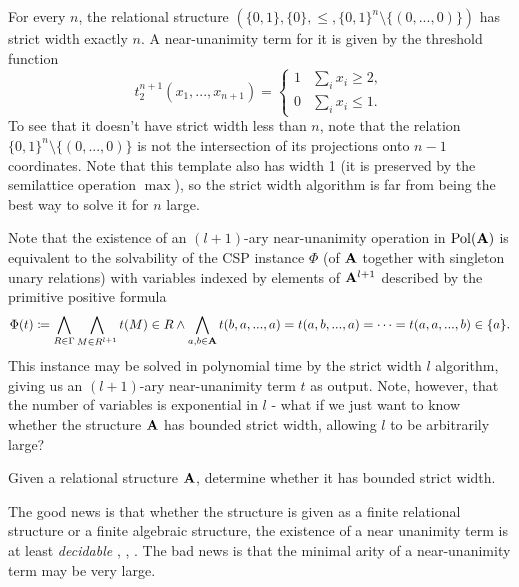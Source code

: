 \documentclass[letterpaper,11pt]{article}
\DeclareMathOperator{\Pol}{Pol}
\begin{document}

\begin{ex}\label{ex-strict-width-n} For every $n$, the relational structure $(\{0,1\}, \{0\}, \le, \{0,1\}^n\setminus\{(0,...,0)\})$ has strict width exactly $n$. A near-unanimity term for it is given by the threshold function
\[
t_2^{n+1}(x_1, ..., x_{n+1}) = \begin{cases} 1 & \sum_i x_i \ge 2,\\ 0 & \sum_i x_i \le 1.\end{cases}
\]
To see that it doesn't have strict width less than $n$, note that the relation $\{0,1\}^n\setminus\{(0,...,0)\}$ is not the intersection of its projections onto $n-1$ coordinates. Note that this template also has width 1 (it is preserved by the semilattice operation $\max$), so the strict width algorithm is far from being the best way to solve it for $n$ large.
\end{ex}

Note that the existence of an $(l+1)$-ary near-unanimity operation in $\Pol(\fA)$ is equivalent to the solvability of the CSP instance $\Phi$ (of $\mathbf{A}$ together with singleton unary relations) with variables indexed by elements of $\mathbf{A}^{l+1}$ described by the primitive positive formula
\[
\Phi(t) \coloneqq \bigwedge_{R \in \Gamma} \bigwedge_{M \in R^{l+1}} t(M) \in R \wedge \bigwedge_{a,b \in \mathbf{A}} t(b,a, ..., a) = t(a,b,...,a) = \cdots = t(a,a,...,b) \in \{a\}.
\]
This instance may be solved in polynomial time by the strict width $l$ algorithm, giving us an $(l+1)$-ary near-unanimity term $t$ as output. Note, however, that the number of variables is exponential in $l$ - what if we just want to know whether the structure $\mathbf{A}$ has bounded strict width, allowing $l$ to be arbitrarily large?

\begin{prob} Given a relational structure $\mathbf{A}$, determine whether it has bounded strict width.
\end{prob}

The good news is that whether the structure is given as a finite relational structure or a finite algebraic structure, the existence of a near unanimity term is at least \emph{decidable} \cite{near-unanimity-maroti}, \cite{near-unanimity-congruence-distributive}, \cite{near-unanimity-zhuk}. The bad news is that the minimal arity of a near-unanimity term may be very large.
\end{document}
